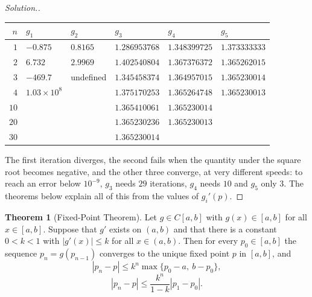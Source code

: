 \documentclass[11pt,a4paper]{article}
\numberwithin{equation}{section}
\theoremstyle{definition}
\newtheorem{thm}{Theorem}[subsection]
\newenvironment{solution}
  {\renewcommand{\qedsymbol}{}\begin{proof}[\textit{Solution}.]}
  {\end{proof}}
\begin{document}
\begin{solution}
\begin{center}
\begin{tabular}{rlllll}
\hline
$n$ & $g_1$ & $g_2$ & $g_3$ & $g_4$ & $g_5$\\
\hline
$1$ & $-0.875$ & $0.8165$ & $1.286953768$ & $1.348399725$ & $1.373333333$\\
$2$ & $6.732$ & $2.9969$ & $1.402540804$ & $1.367376372$ & $1.365262015$\\
$3$ & $-469.7$ & undefined & $1.345458374$ & $1.364957015$ & $1.365230014$\\
$4$ & $1.03\times10^8$ & & $1.375170253$ & $1.365264748$ & $1.365230013$\\
$10$ & & & $1.365410061$ & $1.365230014$ & \\
$20$ & & & $1.365230236$ & $1.365230013$ & \\
$30$ & & & $1.365230014$ & & \\
\hline
\end{tabular}
\end{center}
The first iteration diverges, the second fails when the quantity under the square root becomes negative, and the other three converge, at
very different speeds: to reach an error below $10^{-9}$, $g_3$ needs $29$ iterations, $g_4$ needs $10$ and $g_5$ only $3$. The theorems
below explain all of this from the values of $g_i'(p)$.
\end{solution}

\begin{thm}[Fixed-Point Theorem]
\label{thm:fixedpoint}
Let $g\in C[a,b]$ with $g(x)\in[a,b]$ for all $x\in[a,b]$. Suppose that $g'$ exists on $(a,b)$ and that there is a constant $0<k<1$ with
$|g'(x)|\leq k$ for all $x\in(a,b)$. Then for every $p_0\in[a,b]$ the sequence $p_n = g(p_{n-1})$ converges to the unique fixed point
$p$ in $[a,b]$, and
\begin{equation}\label{eq:fpbound1}
|p_n-p|\leq k^n\max\{p_0-a,\ b-p_0\},
\end{equation}
\begin{equation}\label{eq:fpbound2}
|p_n-p|\leq\frac{k^n}{1-k}|p_1-p_0| .
\end{equation}
\end{thm}
\end{document}
